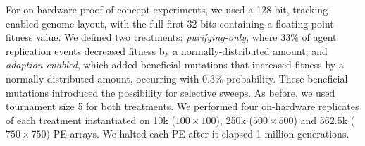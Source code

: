 

% 





For on-hardware proof-of-concept experiments, we used a 128-bit, tracking-enabled genome layout, with the full first 32 bits containing a floating point fitness value.
We defined two treatments: \textit{purifying-only}, where 33\% of agent replication events decreased fitness by a normally-distributed amount,  and \textit{adaption-enabled}, which added beneficial mutations that increased fitness by a normally-distributed amount, occurring with 0.3\% probability.
These beneficial mutations introduced the possibility for selective sweeps.
As before, we used tournament size 5 for both treatments.
We performed four on-hardware replicates of each treatment instantiated on 10k ($100\times100$), 250k ($500\times500$) and 562.5k ($750\times750$) PE arrays.
We halted each PE after it elapsed 1 million generations.

